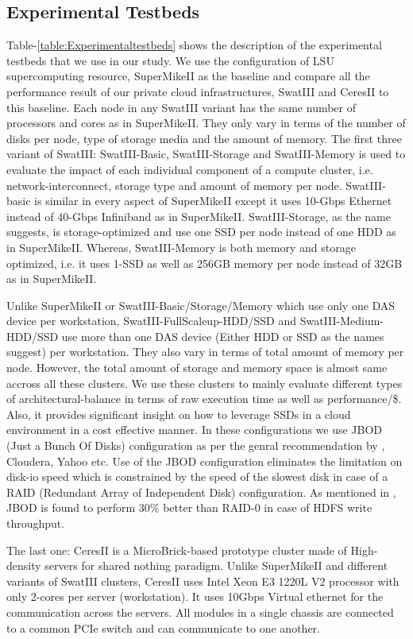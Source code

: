 \documentclass[conference]{IEEEtran}
\begin{document}
\subsection {Experimental Testbeds}
Table-\ref{table:Experimentaltestbeds} shows the description of the experimental testbeds that we use in our study.
We use the configuration of LSU supercomputing resource, SuperMikeII as the baseline and compare all the performance result of our private cloud infrastructures, SwatIII and CeresII to this baseline.
Each node in any SwatIII variant has the same number of processors and cores as in SuperMikeII. 
They only vary in terms of the number of disks per node, type of storage media and the amount of memory.
The first three variant of SwatIII: SwatIII-Basic, SwatIII-Storage and SwatIII-Memory is used to evaluate the impact of each individual component of a compute cluster, i.e. network-interconnect, storage type and amount of memory per node.
SwatIII-basic is similar in every aspect of SuperMikeII except it uses 10-Gbps Ethernet instead of 40-Gbps Infiniband as in SuperMikeII.
SwatIII-Storage, as the name suggests, is storage-optimized and use one SSD per node instead of one HDD as in SuperMikeII.
Whereas, SwatIII-Memory is both memory and storage optimized, i.e. it uses 1-SSD as well as 256GB memory per node instead of 32GB as in SuperMikeII.

Unlike SuperMikeII or SwatIII-Basic/Storage/Memory which use only one DAS device per workstation, SwatIII-FullScaleup-HDD/SSD and SwatIII-Medium-HDD/SSD use more than one DAS device (Either HDD or SSD as the names suggest) per workstation.
They also vary in terms of total amount of memory per node.
However, the total amount of storage and memory space is almost same accross all these clusters.
We use these clusters to mainly evaluate different types of architectural-balance in terms of raw execution time as well as performance/\$.
Also, it provides significant insight on how to leverage SSDs in a cloud environment in a cost effective manner. 
In these configurations we use JBOD (Just a Bunch Of Disks) configuration as per the genral recommendation by \cite{fw:hadoop}, Cloudera, Yahoo etc.
Use of the JBOD configuration eliminates the limitation on disk-io speed which is constrained by the speed of the slowest disk in case of a RAID (Redundant Array of Independent Disk) configuration.
As mentioned in \cite{fw:hadoop}, JBOD is found to perform 30\% better than RAID-0 in case of HDFS write throughput.

The last one: CeresII is a MicroBrick-based prototype cluster made of High-density servers for shared nothing paradigm.
Unlike SuperMikeII and different variants of SwatIII clusters, CeresII uses Intel Xeon E3 1220L V2 processor with only 2-cores per server (workstation). 
It uses 10Gbps Virtual ethernet for the communication across the servers.
All modules in a single chassis are connected to a common PCIe switch and can communicate to one another.
\end{document}
